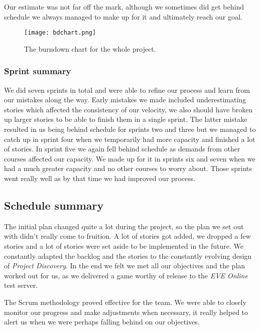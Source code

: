     Our estimate was not far off the mark, although we sometimes did get behind schedule we always managed to make up for it and ultimately reach our goal. 
		
		\begin{figure}[H]
		  \centering
		  \graphicspath{ {./graphics/} }
		  \centerline{\texttt{[image: bdchart.png]}}
		  \caption{\label{fig:bdchart} The burndown chart for the whole project.}
		\end{figure}

	\subsubsection{Sprint summary}
  We did seven sprints in total and were able to refine our process and learn from our mistakes along the way. Early mistakes we made included underestimating stories which affected the consistency of our velocity, we also should have broken up larger stories to be able to finish them in a single sprint. The latter mistake resulted in us being behind schedule for sprints two and three but we managed to catch up in sprint four when we temporarily had more capacity and finished a lot of stories. In sprint five we again fell behind schedule as demands from other courses affected our capacity. We made up for it in sprints six and seven when we had a much greater capacity and no other courses to worry about. Those sprints went really well as by that time we had improved our process. 

\subsection{Schedule summary}
The initial plan changed quite a lot during the project, so the plan we set out with didn't really come to fruition. A lot of stories got added, we dropped a few stories and a lot of stories were set aside to be implemented in the future. We constantly adapted the backlog and the stories to the constantly evolving design of \emph{Project Discovery}. In the end we felt we met all our objectives and the plan worked out for us, as we delivered a game worthy of release to the \emph{EVE Online} test server. 

The Scrum methodology proved effective for the team. We were able to closely monitor our progress and make adjustments when necessary, it really helped to alert us when we were perhaps falling behind on our objectives.